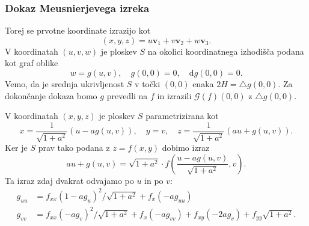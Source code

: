 \documentclass[8pt]{beamer}
\theoremstyle{definition}
\theoremstyle{remark}
\theoremstyle{plain}
\numberwithin{equation}{section}  %
\begin{document}
\begin{frame}
    \frametitle{Dokaz Meusnierjevega izreka}

    Torej se prvotne koordinate izrazijo kot 
    \begin{equation*}
        (x, y, z)=u \mathbf{v}_1+v \mathbf{v}_2+w \mathbf{v}_3.
    \end{equation*}
    V koordinatah $(u,v,w)$ je ploskev $S$ na okolici koordinatnega izhodišča podana kot graf oblike
    \begin{equation*}
        w=g(u, v), \quad g(0,0)=0, \quad \mathrm{d} g(0,0)=0.
    \end{equation*}
    Vemo, da je srednja ukrivljenost $S$ v točki $(0,0)$ enaka $2H=\bigtriangleup g(0,0)$. Za dokončanje dokaza bomo $g$ prevedli na $f$ in izrazili $\mathscr{G}(f)(0,0)$ z $\bigtriangleup g(0,0)$. 
    
    \vspace{0.8em}
    V koordinatah $(x, y, z)$ je ploskev $S$ parametrizirana kot 
    \begin{equation*}
        x=\frac{1}{\sqrt{1+a^2}}(u-a g(u, v)), \quad y=v, \quad z=\frac{1}{\sqrt{1+a^2}}(a u+g(u, v)) .
    \end{equation*}
    Ker je $S$ prav tako podana z $z=f(x, y)$ dobimo izraz
    \begin{equation*}
        a u+g(u, v)=\sqrt{1+a^2} \cdot f\left(\frac{u-a g(u, v)}{\sqrt{1+a^2}}, v\right) .
    \end{equation*}
    Ta izraz zdaj dvakrat odvajamo po $u$ in po $v$: 
    \begin{align*}
        g_{u u} & =f_{x x}\left(1-a g_u\right)^2 / \sqrt{1+a^2}+f_x\left(-a g_{u u}\right) \\
        g_{v v} & =f_{x x}\left(-a g_v\right)^2 / \sqrt{1+a^2}+f_x\left(-a g_{v v}\right)+f_{x y}\left(-2 a g_v\right)+f_{y y} \sqrt{1+a^2} .
    \end{align*}
    
\end{frame}
\end{document}
